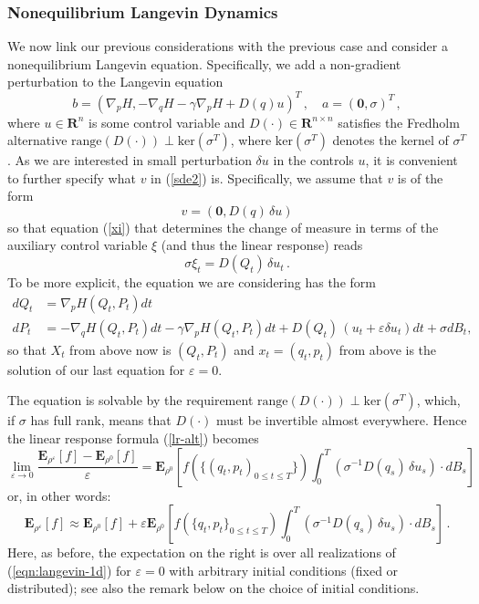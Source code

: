 \documentclass[]{tMPH2e}
\newcommand{\R}{{\mathbf R}}
\newcommand{\eps}{\varepsilon}
\newcommand{\bE}{{\mathbf E}}
\newcommand{\zero}{{\mathbf 0}}
\begin{document}
\subsubsection*{Nonequilibrium Langevin Dynamics}

We now link our previous considerations with the previous case and consider a nonequilibrium Langevin equation. Specifically, we add a non-gradient perturbation to the Langevin equation 
\begin{equation}\label{eqn:langevin-1b}
b = \left(\nabla_{p}H, -\nabla_{q} H - \gamma\nabla_{p}H  + D(q) u \right)^{T}\,,\quad a= (\zero,\sigma)^{T}\,,
\end{equation}
where $u\in\R^{n}$ is some control variable and $D(\cdot)\in\R^{n\times n}$ satisfies the Fredholm alternative $\mathrm{range}(D(\cdot))\perp \mathrm{ker}(\sigma^{T})$, where $\mathrm{ker}(\sigma^T)$ denotes the kernel of $\sigma^T$. As we are interested in small perturbation $\delta u$ in the controls $u$, it is convenient to further specify what $v$ in (\ref{sde2}) is. Specifically, we assume that $v$ is of the form 
\begin{equation}\label{eqn:langevin-1c}
v = (\zero, D(q)\,\delta u)
\end{equation}
so that equation (\ref{xi}) that determines the change of measure in terms of the auxiliary control variable $\xi$ (and thus the linear response) reads 
\[
\sigma \xi_{t} = D(Q_{t})\,\delta u_{t}\,.
\]
To be more explicit, the equation we are considering has the form
\begin{equation}\label{eqn:langevin-1d}
\begin{aligned}
dQ_t & =  \nabla_p H(Q_t,P_t)dt\\
dP_t & =  -\nabla_q H(Q_t,P_t)dt - \gamma \nabla_p H(Q_t,P_t)dt + D(Q_t)\,(u_t+\eps \delta u_t)dt+\sigma dB_t,
\end{aligned}
\end{equation}
so that $X_t$ from above now is $(Q_t,P_t)$ and $x_t=(q_t,p_t)$ from above is the solution of our last equation for $\eps=0$.

The equation is solvable by the requirement  $\mathrm{range}(D(\cdot))\perp \mathrm{ker}(\sigma^{T})$, which, if $\sigma$ has full rank, means that $D(\cdot)$ must be invertible almost everywhere. Hence the linear response formula (\ref{lr-alt})  becomes
\begin{equation}\label{lr-alt2}
\lim_{\eps\to 0}\frac{\bE_{\rho^{\eps}}[f] - \bE_{\rho^{0}}[f]}{\eps} =  \bE_{\rho^{0}}\left[f(\{(q_{t},p_{t})_{0\le t\le T}\})\int_{0}^{T}(\sigma^{-1}D(q_{s})\,\delta u_{s})\cdot dB_{s} \right]\,
\end{equation}
or, in other words: 
\begin{equation}\label{eqn:neq-response}
\bE_{\rho^{\eps}}[f] \approx \bE_{\rho^0}[f] + \eps\bE_{\rho^0}\left[f(\{q_{t},p_{t}\}_{0\le t\le T})\int_{0}^{T}(\sigma^{-1}D(q_{s})\,\delta u_{s})\cdot dB_{s} \right]\,.
\end{equation}
Here, as before, the expectation on the right is over all realizations of (\ref{eqn:langevin-1d}) for $\eps=0$ with arbitrary initial conditions (fixed or distributed); see also the remark below on the choice of initial conditions. 
\end{document}

